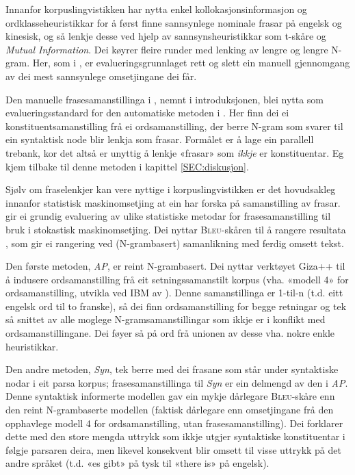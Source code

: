 \documentclass[12pt,a4paper,oneside,draft]{report}
\newcommand{\Bleu}{\textsc{Bleu}}
\begin{document}
Innanfor korpuslingvistikken har \citet{piao2001mwu} nytta enkel
 kollokasjonsinformasjon og ordklasseheuristikkar for å først finne
 sannsynlege nominale frasar på engelsk og kinesisk, og så lenkje
 desse ved hjelp av sannsynsheuristikkar som t-skåre og \emph{Mutual  Information}. Dei køyrer fleire runder med lenking av lengre og
 lengre N-gram.  Her, som i \citet{kupiec1993afn}, er
 evalueringsgrunnlaget rett og slett ein manuell gjennomgang av dei
 mest sannsynlege omsetjingane dei får.

Den manuelle frasesamanstillinga i \citet{samuelsson2006pap}, nemnt i
 introduksjonen, blei nytta som evalueringsstandard for den
 automatiske metoden i \citet{samuelsson2007apa}.  Her finn dei ei
 konstituentsamanstilling frå ei ordsamanstilling, der berre N-gram
 som svarer til ein syntaktisk node blir lenkja som frasar. Formålet
 er å lage ein parallell trebank, kor det altså er unyttig å lenkje
 «frasar» som \emph{ikkje} er konstituentar. Eg kjem tilbake til denne
 metoden i kapittel \ref{SEC:diskusjon}.

Sjølv om fraselenkjer kan vere nyttige i korpuslingvistikken er det
 hovudsakleg innanfor statistisk maskinomsetjing at ein har forska på
 samanstilling av frasar. \citet{koehn2003spb} gir ei grundig
 evaluering av ulike statistiske metodar for frasesamanstilling til
 bruk i stokastisk maskinomsetjing. Dei nyttar \Bleu-skåren til å
 rangere resultata
 \citep[Papineni~et~al.,~2001,~i][s.~51]{koehn2003spb}, som gir ei
 rangering ved (N-grambasert) samanlikning med ferdig omsett tekst.

Den første metoden, \emph{AP}, er reint N-grambasert. Dei nyttar verktøyet
 Giza++ \citep[Och og Ney, 2000, i][s.~50]{koehn2003spb} til å
 indusere ordsamanstilling frå eit setningssamanstilt korpus
 (vha. «modell 4» for ordsamanstilling, utvikla ved IBM av
 \citet{brown1993msm}). Denne samanstillinga er 1-til-n (t.d. eitt
 engelsk ord til to franske), så dei finn ordsamanstilling for begge
 retningar og tek så snittet av alle moglege N-gramsamanstillingar som
 ikkje er i konflikt med ordsamanstillingane. Dei føyer så på ord frå
 unionen av desse vha. nokre enkle heuristikkar.

Den andre metoden, \emph{Syn}, tek berre med dei frasane som står under
 syntaktiske nodar i eit parsa korpus; frasesamanstillinga til \emph{Syn}
 er ein delmengd av den i \emph{AP}. Denne syntaktisk informerte modellen
 gav ein mykje dårlegare \Bleu-skåre enn den reint N-grambaserte
 modellen (faktisk dårlegare enn omsetjingane frå den opphavlege
 modell 4 for ordsamanstilling, utan frasesamanstilling). Dei
 forklarer dette med den store mengda uttrykk som ikkje utgjer
 syntaktiske konstituentar i følgje parsaren deira, men likevel
 konsekvent blir omsett til visse uttrykk på det andre språket
 (t.d. «es gibt» på tysk til «there is» på engelsk).
\end{document}
